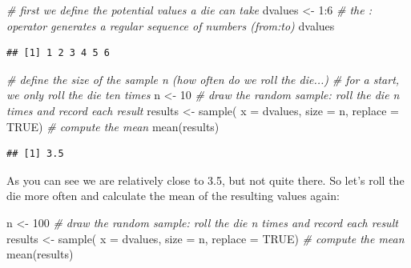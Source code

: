 \documentclass[
  12pt,
]{style/krantz}
\newenvironment{Shaded}{\begin{snugshade}}{\end{snugshade}}
\newcommand{\AttributeTok}[1]{\textcolor[rgb]{0.77,0.63,0.00}{#1}}
\newcommand{\CommentTok}[1]{\textcolor[rgb]{0.56,0.35,0.01}{\textit{#1}}}
\newcommand{\ConstantTok}[1]{\textcolor[rgb]{0.00,0.00,0.00}{#1}}
\newcommand{\DecValTok}[1]{\textcolor[rgb]{0.00,0.00,0.81}{#1}}
\newcommand{\FunctionTok}[1]{\textcolor[rgb]{0.00,0.00,0.00}{#1}}
\newcommand{\NormalTok}[1]{#1}
\newcommand{\OtherTok}[1]{\textcolor[rgb]{0.56,0.35,0.01}{#1}}
\newcommand{\SpecialCharTok}[1]{\textcolor[rgb]{0.00,0.00,0.00}{#1}}
\begin{document}
\begin{Shaded}
\begin{Highlighting}[]
\CommentTok{\# first we define the potential values a die can take}
\NormalTok{dvalues }\OtherTok{\textless{}{-}} \DecValTok{1}\SpecialCharTok{:}\DecValTok{6} \CommentTok{\# the : operator generates a regular sequence of numbers (from:to)}
\NormalTok{dvalues}
\end{Highlighting}
\end{Shaded}

\begin{verbatim}
## [1] 1 2 3 4 5 6
\end{verbatim}

\begin{Shaded}
\begin{Highlighting}[]
\CommentTok{\# define the size of the sample n (how often do we roll the die...)}
\CommentTok{\# for a start, we only roll the die ten times}
\NormalTok{n }\OtherTok{\textless{}{-}} \DecValTok{10}
\CommentTok{\# draw the random sample: \textquotesingle{}roll the die n times and record each result\textquotesingle{}}
\NormalTok{results }\OtherTok{\textless{}{-}} \FunctionTok{sample}\NormalTok{( }\AttributeTok{x =}\NormalTok{ dvalues, }\AttributeTok{size =}\NormalTok{ n, }\AttributeTok{replace =} \ConstantTok{TRUE}\NormalTok{)}
\CommentTok{\# compute the mean}
\FunctionTok{mean}\NormalTok{(results)}
\end{Highlighting}
\end{Shaded}

\begin{verbatim}
## [1] 3.5
\end{verbatim}

As you can see we are relatively close to 3.5, but not quite there. So let's roll the die more often and calculate the mean of the resulting values again:

\begin{Shaded}
\begin{Highlighting}[]
\NormalTok{n }\OtherTok{\textless{}{-}} \DecValTok{100}
\CommentTok{\# draw the random sample: \textquotesingle{}roll the die n times and record each result\textquotesingle{}}
\NormalTok{results }\OtherTok{\textless{}{-}} \FunctionTok{sample}\NormalTok{( }\AttributeTok{x =}\NormalTok{ dvalues, }\AttributeTok{size =}\NormalTok{ n, }\AttributeTok{replace =} \ConstantTok{TRUE}\NormalTok{)}
\CommentTok{\# compute the mean}
\FunctionTok{mean}\NormalTok{(results)}
\end{Highlighting}
\end{Shaded}
\end{document}
